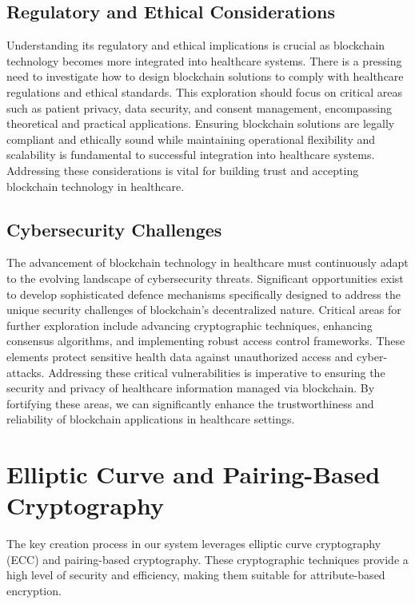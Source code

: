 \documentclass[cic,tc,english]{iiufrgs}
\begin{document}
    \subsection{Regulatory and Ethical Considerations} 
        Understanding its regulatory and ethical implications is crucial as blockchain technology becomes more integrated into healthcare systems. There is a pressing need to investigate how to design blockchain solutions to comply with healthcare regulations and ethical standards. This exploration should focus on critical areas such as patient privacy, data security, and consent management, encompassing theoretical and practical applications. Ensuring blockchain solutions are legally compliant and ethically sound while maintaining operational flexibility and scalability is fundamental to successful integration into healthcare systems. Addressing these considerations is vital for building trust and accepting blockchain technology in healthcare.

    \subsection{Cybersecurity Challenges} 
        The advancement of blockchain technology in healthcare must continuously adapt to the evolving landscape of cybersecurity threats. Significant opportunities exist to develop sophisticated defence mechanisms specifically designed to address the unique security challenges of blockchain's decentralized nature. Critical areas for further exploration include advancing cryptographic techniques, enhancing consensus algorithms, and implementing robust access control frameworks. These elements protect sensitive health data against unauthorized access and cyber-attacks. Addressing these critical vulnerabilities is imperative to ensuring the security and privacy of healthcare information managed via blockchain. By fortifying these areas, we can significantly enhance the trustworthiness and reliability of blockchain applications in healthcare settings.

\section{Elliptic Curve and Pairing-Based Cryptography}

The key creation process in our system leverages elliptic curve cryptography (ECC) and pairing-based cryptography. These cryptographic techniques provide a high level of security and efficiency, making them suitable for attribute-based encryption.
\end{document}
